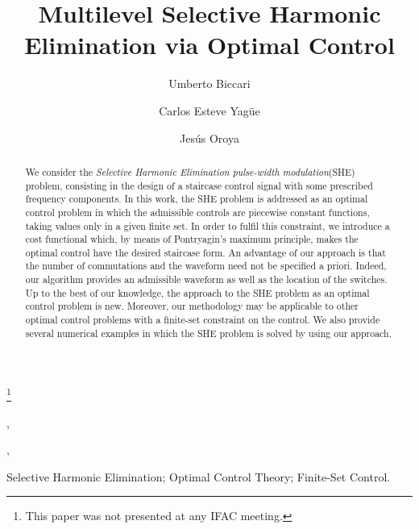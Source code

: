 \documentclass[twocolumn]{autart}    %
\begin{document}
\begin{frontmatter}

\title{Multilevel Selective Harmonic Elimination via Optimal Control} %

\thanks[footnoteinfo]{This paper was not presented at any IFAC 
meeting.}

\author[FD,UD]{Umberto Biccari},    %
\author[UAM,FD]{Carlos Esteve Yagüe},               %
\author[UD]{Jes\'us Oroya}  %
\address[FD]{Chair of Computational Mathematics, Fundaci\'on Deusto, Avenida de las Universidades 24, 48007 Bilbao, Basque Country, Spain.}  %
\address[UD]{Universidad de Deusto, Avenida de las Universidades 24, 48007 Bilbao, Basque Country, Spain.}  %
\address[UAM]{Departamento de Matem\'aticas, Universidad Aut\'onoma de Madrid, 28049 Madrid, Spain.}  %
          
\begin{keyword}                           %
Selective Harmonic Elimination; Optimal Control Theory; Finite-Set Control.    %
\end{keyword}                             %


\begin{abstract}                          %
We consider the \emph{Selective Harmonic Elimination pulse-width modulation}(SHE) problem, consisting in the design of a staircase control signal with some prescribed frequency components. 
In this work, the SHE problem is addressed as an optimal control problem in which the admissible controls are piecewise constant functions, taking values only in a given finite set. 
In order to fulfil this constraint, we  introduce a cost functional which, by means of Pontryagin's maximum principle, makes the optimal control have the desired staircase form.
An advantage of our approach is that the number of commutations and the waveform need not be specified a priori.
Indeed, our algorithm provides an admissible waveform as well as the location of the switches. 
Up to the best of our knowledge, the approach to the SHE problem as an optimal control problem is new.
Moreover,  our methodology may be applicable to other optimal control problems with a finite-set constraint on the control.
We also provide several numerical examples in which the SHE problem is solved by using our approach.
\end{abstract}

\end{frontmatter}
\end{document}
